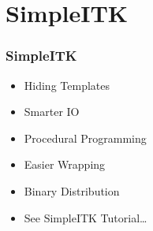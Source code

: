 \section{SimpleITK}



{
\begin{frame}
\frametitle{SimpleITK}
\Huge
\begin{itemize}
\item Hiding Templates
\pause
\item Smarter IO
\pause
\item Procedural Programming
\pause
\item Easier Wrapping
\pause
\item Binary Distribution
\pause
\item See SimpleITK Tutorial\dots
\end{itemize}
\end{frame}
}


